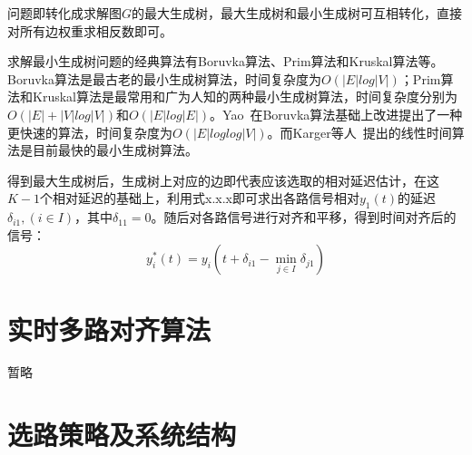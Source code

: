 问题即转化成求解图$G$的最大生成树，最大生成树和最小生成树可互相转化，直接对所有边权重求相反数即可。

求解最小生成树问题的经典算法有Boruvka算法、Prim算法和Kruskal算法等。Boruvka算法是最古老的最小生成树算法，时间复杂度为$O(|E|log|V|)$；Prim算法和Kruskal算法是最常用和广为人知的两种最小生成树算法，时间复杂度分别为$O(|E|+|V|log|V|)$和$O(|E|log|E|)$。Yao~\cite{YAO197521}在Boruvka算法基础上改进提出了一种更快速的算法，时间复杂度为$O(|E|loglog|V|)$。而Karger等人~\cite{Karger:1995:RLA:201019.201022}提出的线性时间算法是目前最快的最小生成树算法。

得到最大生成树后，生成树上对应的边即代表应该选取的相对延迟估计，在这$K-1$个相对延迟的基础上，利用式x.x.x即可求出各路信号相对$y_1 (t)$的延迟$\delta_{i1},(i \in I)$，其中$\delta_{11}=0$。随后对各路信号进行对齐和平移，得到时间对齐后的信号：
\begin{equation}
y_i^* (t)=y_i (t+\delta_{i1}-\min_{j\in I}\delta_{j1})
\end{equation}

\section{实时多路对齐算法}

暂略

\section{选路策略及系统结构}



